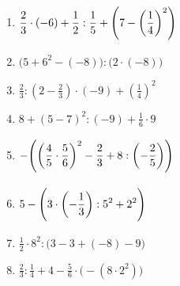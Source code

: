 \begin{enumerate}
\renewcommand{\labelenumi}{\textbf{\arabic{enumi})}}
\setlength{\itemsep}{0pt}
\medmuskip=8mu\thickmuskip=8mu
\item $\displaystyle \frac{2}{3}\cdot (-6)+\frac{1}{2}:\frac{1}{5}+\left(\mathopen{\vphantom{\rule[-1.40em]{0pt}{3.30em}}}7-\left(\frac{1}{4}\right)^{2}\right)$
\par\vspace{5cm}
\item $\displaystyle \bigl(5+6^{2}-(-8)\bigr):\bigl(2\cdot (-8)\bigr)$
\par\vspace{5cm}
\item $\displaystyle \frac{2}{3}:\left(2-\frac{2}{3}\right)\cdot (-9)+\left(\frac{1}{4}\right)^{2}$
\par\vspace{5cm}
\item $\displaystyle 8+(5-7)^{2}:(-9)+\frac{1}{6}\cdot 9$
\par\vspace{5cm}
\item $\displaystyle -\mathopen{}\left(\mathopen{\vphantom{\rule[-1.40em]{0pt}{3.30em}}}\left(\frac{4}{5}\cdot \frac{5}{6}\right)^{2}-\frac{2}{3}+8:\left(-\frac{2}{5}\right)\right)$
\par\vspace{5cm}
\item $\displaystyle 5-\left(\mathopen{\vphantom{\rule[-1.40em]{0pt}{3.30em}}}3\cdot \left(-\frac{1}{3}\right):5^{2}+2^{2}\right)$
\par\vspace{5cm}
\item $\displaystyle \frac{1}{2}\cdot 8^{2}:\bigl(3-3+(-8)-9\bigr)$
\par\vspace{5cm}
\item $\displaystyle \frac{2}{3}:\frac{1}{4}+4-\frac{5}{6}\cdot \bigl(-(8\cdot 2^{2})\bigr)$
\par\vspace{5cm}
\end{enumerate}
